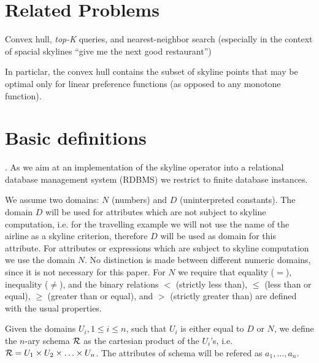 \section{Related Problems}
Convex hull, \emph{top-K} queries, and nearest-neighbor search (especially in the context of spacial skylines ``give me the next good restaurant'')

In particlar, the convex hull contains the subset of skyline points that may be optimal only for linear preference functions (as opposed to any monotone function).





\clearpage 
{}
\section{Basic definitions}
. As we aim at an implementation of the skyline operator into a relational database management system (RDBMS) we restrict to finite database instances.

We assume two  domains: $N$ (numbers) and $D$ (uninterpreted constants). The domain $D$ will be used for attributes which are not subject to skyline computation, i.e. for the travelling example we will not use the name of the airline as a skyline criterion, therefore $D$ will be used as domain for this attribute.
For attributes or expressions which are subject to skyline computation we use the domain $N$. No distinction is made between different numeric domains, since it is not necessary for this paper. For $N$ we require that equality ($=$), inequality ($\not=$), and the binary relations $<$ (strictly less than), $\le$ (less than or equal), $\ge$ (greater than or equal), and $>$ (strictly greater than) are defined with the usual properties.

\begin{definition}[Schema]
Given the domains $U_i, 1 \le i \le n$, such that $U_i$ is either equal to $D$ or $N$, we define the $n$-ary schema $\mathcal{R}$ as the cartesian product of the $U_i$'s, i.e. $\mathcal{R} = U_1 \times U_2 \times \ldots \times U_n$. The attributes of schema  will be refered as $a_1, \ldots, a_n$.
\end{definition}

